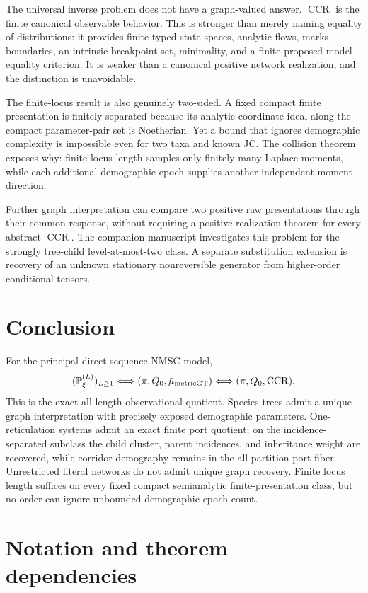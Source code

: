 \documentclass[11pt]{article}
\newcommand{\CCR}{\operatorname{CCR}}
\begin{document}
The universal inverse problem does not have a graph-valued answer.  $\CCR$ is the finite canonical observable behavior.  This is stronger than merely naming equality of distributions: it provides finite typed state spaces, analytic flows, marks, boundaries, an intrinsic breakpoint set, minimality, and a finite proposed-model equality criterion.  It is weaker than a canonical positive network realization, and the distinction is unavoidable.

The finite-locus result is also genuinely two-sided.  A fixed compact finite presentation is finitely separated because its analytic coordinate ideal along the compact parameter-pair set is Noetherian.  Yet a bound that ignores demographic complexity is impossible even for two taxa and known JC.  The collision theorem exposes why: finite locus length samples only finitely many Laplace moments, while each additional demographic epoch supplies another independent moment direction.

Further graph interpretation can compare two positive raw presentations through their common response, without requiring a positive realization theorem for every abstract $\CCR$.  The companion manuscript investigates this problem for the strongly tree-child level-at-most-two class.  A separate substitution extension is recovery of an unknown stationary nonreversible generator from higher-order conditional tensors.

\section{Conclusion}

For the principal direct-sequence NMSC model,
\[
(\mathbb P_\xi^{(L)})_{L\ge1}
\Longleftrightarrow
(\pi,Q_0,\bar\mu_{\rm metricGT})
\Longleftrightarrow
(\pi,Q_0,\CCR).
\]
This is the exact all-length observational quotient.  Species trees admit a unique graph interpretation with precisely exposed demographic parameters.  One-reticulation systems admit an exact finite port quotient; on the incidence-separated subclass the child cluster, parent incidences, and inheritance weight are recovered, while corridor demography remains in the all-partition port fiber.  Unrestricted literal networks do not admit unique graph recovery.  Finite locus length suffices on every fixed compact semianalytic finite-presentation class, but no order can ignore unbounded demographic epoch count.

\appendix
\section{Notation and theorem dependencies}
\end{document}
